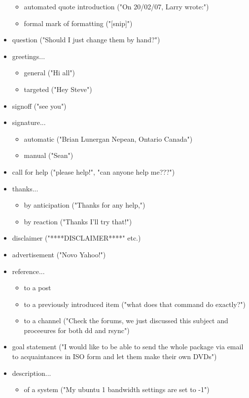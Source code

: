 \documentclass[11pt]{article}
\begin{document}
\begin{itemize}
\begin{itemize}
			\item automated quote introduction ("On 20/02/07, Larry wrote:")
			\item formal mark of formatting ("[snip]")
		\end{itemize}
	\item question ("Should I just change them by hand?")
	\item greetings...
		\begin{itemize}
			\item general ("Hi all")
			\item targeted ("Hey Steve")
		\end{itemize}
	\item signoff ("see you")
	\item signature...
		\begin{itemize}
			\item automatic ("Brian Lunergan Nepean, Ontario Canada")
			\item manual ("Sean")
		\end{itemize}
	\item call for help ("please help!", "can anyone help me???")
	\item thanks...
		\begin{itemize}
			\item by anticipation ("Thanks for any help,")
			\item by reaction ("Thanks I'll try that!")
		\end{itemize}
	\item disclaimer ("****DISCLAIMER****" etc.)
	\item advertisement ("Novo Yahoo!")
	\item reference...
		\begin{itemize}
			\item to a post
			\item to a previously introduced item ("what does that command do exactly?")
			\item to a channel ("Check the forums, we just discussed this subject and proceeures for both dd and rsync")
		\end{itemize}
	\item goal statement ("I would like to be able to send the whole package via email to acquaintances in ISO form and let them make their own DVDs")
	\item description...
		\begin{itemize}
			\item of a system ("My ubuntu 1 bandwidth settings are set to -1")

\end{itemize}
\end{itemize}
\end{document}
